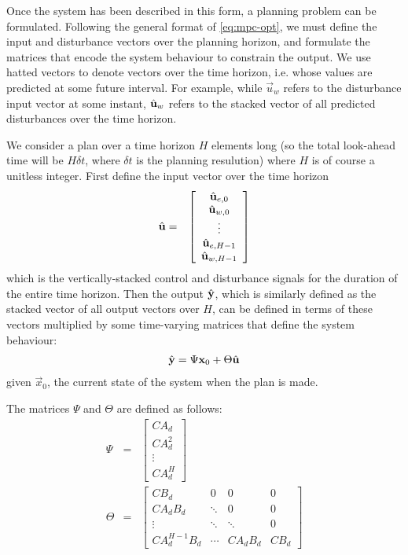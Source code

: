 Once the system has been described in this form, a planning problem can be formulated.
Following the general format of \autoref{eq:mpc-opt}, we must define the input and disturbance vectors over the planning horizon, and formulate the matrices that encode the system behaviour to constrain the output.
We use hatted vectors to denote vectors over the time horizon, i.e. whose values are predicted at some future interval.
For example, while $\vec{u}_w$ refers to the disturbance input vector at some instant, $\hat{\mathbf{u}}_w$ refers to the stacked vector of all predicted disturbances over the time horizon.

We consider a plan over a time horizon $H$ elements long (so the total look-ahead time will be $H \delta t$, where $\delta t$ is the planning resulution) where $H$ is of course a unitless integer.
First define the input vector over the time horizon
\begin{eqnarray*}
   \hat{\mathbf{u}} &=& \left[\begin{array}{c}
      \hat{\mathbf{u}}_{e, 0} \\ \hat{\mathbf{u}}_{w, 0} \\
      \vdots \\
      \hat{\mathbf{u}}_{e, H-1} \\ \hat{\mathbf{u}}_{w, H-1}
   \end{array}\right]
\end{eqnarray*}
which is the vertically-stacked control and disturbance signals for the duration of the entire time horizon.
Then the output $\hat{\mathbf{y}}$, which is similarly defined as the stacked vector of all output vectors over $H$, can be defined in terms of these vectors multiplied by some time-varying matrices that define the system behaviour:
\begin{eqnarray}
   \label{eq:mpc-vectors}
   \hat{\mathbf{y}} = \Psi \mathbf{x}_0 + \Theta \hat{\mathbf{u}}
\end{eqnarray}
given $\vec{x}_0$, the current state of the system when the plan is made.

The matrices $\Psi$ and $\Theta$ are defined as follows:
\begin{eqnarray}
   \label{eq:mpc-psi}
   \Psi &=& \left[\begin{array}{c}
      CA_d \\ CA_d^2 \\ \vdots \\ CA_d^H
   \end{array}\right]
   \\
   \label{eq:mpc-theta}
   \Theta &=& \left[\begin{array}{cccc}
      C B_d & 0 & 0 & 0 \\
      C A_d B_d & \ddots & 0 & 0 \\
      \vdots & \ddots & \ddots & 0 \\
      C A_d ^{H-1} B_d & \cdots & C A_d B_d & C B_d
   \end{array}\right]
\end{eqnarray}


